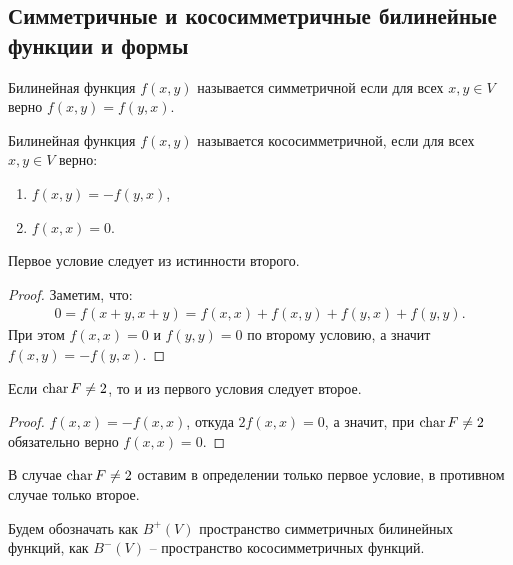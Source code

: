 
\subsection{Симметричные и кососимметричные билинейные функции и формы}

\begin{definition}
    Билинейная функция $f(x, y)$ называется симметричной если для всех $x, y \in V$ верно 
    $f(x, y) = f(y, x)$.
\end{definition}

\begin{definition}
    Билинейная функция $f(x, y)$ называется кососимметричной, если для всех $x, y \in V$ верно:
    \begin{enumerate}
        \item $f(x, y) = -f(y, x)$,
        \item $f(x, x) = 0$.
    \end{enumerate}
\end{definition}

\begin{note}
    Первое условие следует из истинности второго.
\end{note}

\begin{proof}
    Заметим, что:
    \begin{gather*}
        0 = f(x+y, x+y) = f(x, x) + f(x, y) + f(y, x) + f(y, y).
    \end{gather*}
    При этом $f(x, x) = 0$ и $f(y, y) = 0$ по второму условию, а значит $f(x, y) = - f(y, x)$.
\end{proof}

\begin{note}
    Если $\operatorname{char} F \neq 2$, то и из первого условия следует второе.
\end{note}

\begin{proof}
    $f(x, x) = - f(x, x)$, откуда $2 f(x, x) = 0$, а значит, при $\operatorname{char} F \neq 2$ обязательно 
    верно $f(x, x) = 0$.
\end{proof}

\begin{agreement}
    В случае $\operatorname{char} F \neq 2$ оставим в определении только первое условие, 
    в противном случае только второе.
\end{agreement}

\begin{agreement}
    Будем обозначать как $B^{+}(V)$ пространство симметричных билинейных функций, как $B^-(V)$ -- 
    пространство кососимметричных функций.
\end{agreement}

